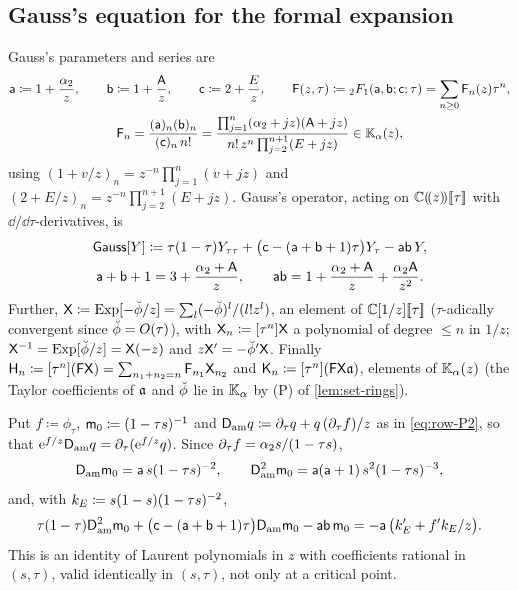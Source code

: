 \subsection{Gauss's equation for the formal expansion}
\label{sec:row-gauss}

Gauss's parameters and series are
\begin{equation}
\label{eq:row-gaussdef}
\begin{gathered}
\mathsf{a}\coloneqq1+\frac{\alpha_2}{z},\qquad \mathsf{b}\coloneqq1+\frac{\mathsf{A}}{z},\qquad \mathsf{c}\coloneqq2+\frac Ez,\qquad
\mathsf{F}(z,\tau)\coloneqq{}_2F_1(\mathsf{a},\mathsf{b};\mathsf{c};\tau)=\sum_{n\geq0}\mathsf{F}_n(z)\tau^n,\\
\mathsf{F}_n=\frac{(\mathsf{a})_n(\mathsf{b})_n}{(\mathsf{c})_n\,n!}=\frac{\prod_{j=1}^{n}(\alpha_2+jz)(\mathsf{A}+jz)}{n!\,z^n\prod_{j=2}^{n+1}(E+jz)}\in\mathbb{K}_{\alpha}(z),
\end{gathered}
\end{equation}
using $(1+v/z)_n=z^{-n}\prod_{j=1}^n(v+jz)$ and $(2+E/z)_n=z^{-n}\prod_{j=2}^{n+1}(E+jz)$. Gauss's operator, acting on $\mathbb{C}(\!(z)\!)[\![ \tau ]\!]$ with $\dd/\dd\tau$-derivatives, is
\begin{equation}
\label{eq:row-gaussop}
\begin{gathered}
\mathsf{Gauss}[Y]\coloneqq\tau(1-\tau)Y_{\tau\tau}+\big(\mathsf{c}-(\mathsf{a}+\mathsf{b}+1)\tau\big)Y_\tau-\mathsf{a}\mathsf{b}\,Y,\\
\mathsf{a}+\mathsf{b}+1=3+\frac{\alpha_2+\mathsf{A}}{z},\qquad \mathsf{a}\mathsf{b}=1+\frac{\alpha_2+\mathsf{A}}{z}+\frac{\alpha_2\mathsf{A}}{z^2}.
\end{gathered}
\end{equation}
Further, $\mathsf{X}\coloneqq\mathrm{Exp}[-\breve{\phi}/z]=\sum_l(-\breve{\phi})^l/(l!z^l)$, an element of $\mathbb{C}[1/z][\![ \tau ]\!]$ ($\tau$-adically convergent since $\breve{\phi}=O(\tau)$), with $\mathsf{X}_n\coloneqq[\tau^n]\mathsf{X}$ a polynomial of degree $\leq n$ in $1/z$; $\mathsf{X}^{-1}=\mathrm{Exp}[\breve{\phi}/z]=\mathsf{X}(-z)$ and $z\mathsf{X}'=-\breve{\phi}'\mathsf{X}$. Finally $\mathsf{H}_n\coloneqq[\tau^n](\mathsf{F}\mathsf{X})=\sum_{n_1+n_2=n}\mathsf{F}_{n_1}\mathsf{X}_{n_2}$ and $\mathsf{K}_n\coloneqq[\tau^n](\mathsf{F}\mathsf{X}\mathfrak{a})$, elements of $\mathbb{K}_{\alpha}(z)$ (the Taylor coefficients of $\mathfrak{a}$ and $\breve{\phi}$ lie in $\mathbb{K}_{\alpha}$ by (P) of \cref{lem:set-rings}).

\begin{lem}
\label{lem:row-amp}
Put $f\coloneqq\phi_\tau$, $\mathsf{m}_0\coloneqq(1-\tau s)^{-1}$ and $\mathsf{D}_{\mathrm{am}} q\coloneqq\partial_\tau q+q\,(\partial_\tau f)/z$ as in \eqref{eq:row-P2}, so that $\mathrm{e}^{f/z}\mathsf{D}_{\mathrm{am}} q=\partial_\tau(\mathrm{e}^{f/z}q)$. Since $\partial_\tau f=\alpha_2s/(1-\tau s)$,
\[
\mathsf{D}_{\mathrm{am}}\mathsf{m}_0=\mathsf{a}\,s(1-\tau s)^{-2},\qquad \mathsf{D}_{\mathrm{am}}^2\mathsf{m}_0=\mathsf{a}(\mathsf{a}+1)\,s^2(1-\tau s)^{-3},
\]
and, with $k_E\coloneqq s(1-s)(1-\tau s)^{-2}$,
\begin{equation}
\label{eq:row-amp}
\tau(1-\tau)\mathsf{D}_{\mathrm{am}}^2\mathsf{m}_0+\big(\mathsf{c}-(\mathsf{a}+\mathsf{b}+1)\tau\big)\mathsf{D}_{\mathrm{am}}\mathsf{m}_0-\mathsf{a}\mathsf{b}\,\mathsf{m}_0=-\mathsf{a}\,\big(k_E'+f'k_E/z\big).
\end{equation}
This is an identity of Laurent polynomials in $z$ with coefficients rational in $(s,\tau)$, valid identically in $(s,\tau)$, not only at a critical point.
\end{lem}

